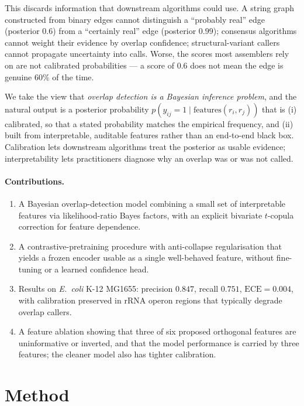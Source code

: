 \documentclass[11pt]{article}
\begin{document}
This discards information that downstream algorithms could use. A string
graph constructed from binary edges cannot distinguish a ``probably real''
edge (posterior $0.6$) from a ``certainly real'' edge (posterior $0.99$);
consensus algorithms cannot weight their evidence by overlap confidence;
structural-variant callers cannot propagate uncertainty into calls. Worse,
the scores most assemblers rely on are not calibrated probabilities --- a
score of $0.6$ does not mean the edge is genuine $60\%$ of the time.

We take the view that \emph{overlap detection is a Bayesian inference
problem}, and the natural output is a posterior probability
$p(y_{ij} = 1 \mid \text{features}(r_i, r_j))$ that is (i) calibrated, so
that a stated probability matches the empirical frequency, and (ii) built
from interpretable, auditable features rather than an end-to-end black box.
Calibration lets downstream algorithms treat the posterior as usable
evidence; interpretability lets practitioners diagnose why an overlap was or
was not called.

\paragraph{Contributions.}
\begin{enumerate}
    \item A Bayesian overlap-detection model combining a small set of
    interpretable features via likelihood-ratio Bayes factors, with an
    explicit bivariate $t$-copula correction for feature dependence.
    \item A contrastive-pretraining procedure with anti-collapse
    regularisation that yields a frozen encoder usable as a single
    well-behaved feature, without fine-tuning or a learned confidence head.
    \item Results on \textit{E.\ coli} K-12 MG1655: precision $0.847$,
    recall $0.751$, $\mathrm{ECE}=0.004$, with calibration preserved in rRNA
    operon regions that typically degrade overlap callers.
    \item A feature ablation showing that three of six proposed orthogonal
    features are uninformative or inverted, and that the model performance
    is carried by three features; the cleaner model also has tighter
    calibration.
\end{enumerate}

\section{Method}
\end{document}
